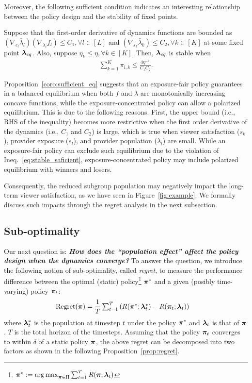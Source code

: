 Moreover, the following sufficient condition indicates an interesting relationship between the policy design and the stability of fixed points.

\begin{proposition} \label{coro:sufficient_eq}
Suppose that the first-order derivative of dynamics functions are bounded as $(\nabla_{e_l} \bar{\lambda}_l) (\nabla_{\lambda_l} f_l) \leq C_1, \forall l \in [L]$ and $(\nabla_{s_k} \bar{\lambda}_k) \leq C_2, \forall k \in [K]$ at some fixed point $\bm{\lambda}_{eq}$. Also, suppose $\eta_k \leq \eta, \forall k \in [K]$. Then, $\bm{\lambda}_{eq}$ is stable when 
\begin{align}
    \textstyle\sum_{k=1}^{K} \pi_{l,k} \leq \frac{4 \eta^{-1}}{C_1 C_2}. \label{eq:stable_saficient}
\end{align}
\end{proposition}

Proposition~\ref{coro:sufficient_eq} suggests that an exposure-fair policy guarantees in a balanced equilibrium when both $f$ and $\bar{\lambda}$ are monotonically increasing concave 
functions, while the exposure-concentrated policy can allow a polarized equilibrium. This is due to the following reasons. First, the upper bound (i.e., RHS of the inequality) becomes more restrictive when the first order derivative of the dynamics (i.e., $C_1$ and $C_2$) is large, which is true when viewer satisfaction ($s_k$), provider exposure ($e_l$), and provider population ($\lambda_l$) are small. While an exposure-fair policy can exclude such equilibrium due to the violation of Ineq.~\eqref{eq:stable_saficient}, exposure-concentrated policy may include polarized equilibrium with winners and losers.

Consequently, the reduced subgroup population may negatively impact the long-term viewer satisfaction, as we have seen in Figure~\ref{fig:example}. We formally discuss such impacts through the regret analysis in the next subsection.

\subsection{Sub-optimality} 
Our next question is: \textbf{\textit{How does the ``population effect'' affect the policy design when the dynamics converge?}}
To answer the question, we introduce the following notion of sub-optimality, called \textit{regret}, to measure the performance difference between the optimal (static) policy\footnote{{$\bm{\pi}^{\ast} := {\arg\max}_{\bm{\pi} \in \Pi} \sum_{t=1}^T R(\bm{\pi}; \bm{\lambda}_t)$}}  $\bm{\pi}^{\ast}$ and a given (posibly time-varying) policy $\bm{\pi}_t$:
\begin{align*}
    \text{Regret}(\bm{\pi})
    &= \frac{1}{T} \textstyle\sum_{t=1}^T \left( R(\bm{\pi}^{\ast}; \bm{\lambda}_t^{\ast}) - R(\bm{\pi}_t; \bm{\lambda}_t) \right)
\end{align*}
where 
$\bm{\lambda}_t^{\ast}$ is the population at timestep $t$ under the policy $\bm{\pi}^{\ast}$ and $\bm{\lambda}_t$ is that of $\bm{\pi}$. $T$ is the total horizon of the timesteps. 
Assuming that the policy $\bm{\pi}_t$ converges to within $\delta$ of a static policy $\bm{\pi}$, the above regret can be decomposed into two factors as shown in the following Proposition~\ref{prop:regret}.

